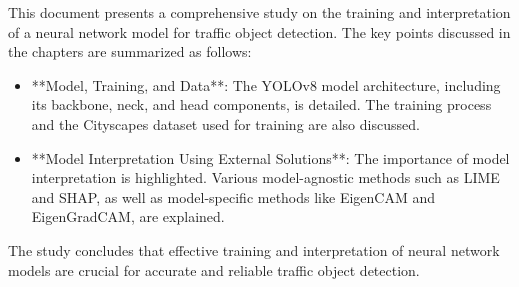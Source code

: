 \documentclass[11pt,a4paper,twoside,openright]{report}  %
\begin{document}
This document presents a comprehensive study on the training and interpretation of a neural network
model for traffic object detection.
The key points discussed in the chapters are summarized as follows:

\begin{itemize}
    \item **Model, Training, and Data**: The YOLOv8 model architecture, including its backbone, neck, and head components, is detailed. The training process and the Cityscapes dataset used for training are also discussed.
    \item **Model Interpretation Using External Solutions**: The importance of model interpretation is highlighted. Various model-agnostic methods such as LIME and SHAP, as well as model-specific methods like EigenCAM and EigenGradCAM, are explained.
\end{itemize}

The study concludes that effective training and interpretation of neural network models are crucial for accurate and reliable traffic object detection.





%








\end{document}
